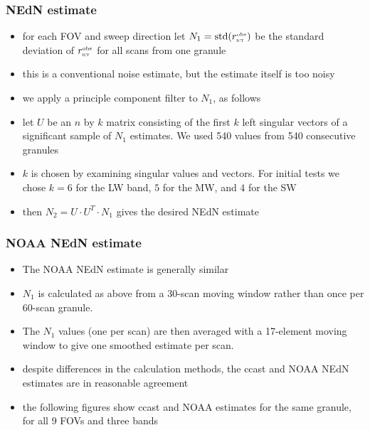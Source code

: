\documentclass[11pt]{beamer}
\begin{document}
\begin{frame}
\frametitle{NEdN estimate}

\begin{itemize}
  \item for each FOV and sweep direction let $N_1 = \mbox{std}(r_{\mbox{\tiny\textsc{ict}}}^{\mbox{\tiny obs}})$
    be the standard deviation of $r_{\mbox{\tiny\textsc{ict}}}^{\mbox{\tiny obs}}$ for all scans from one
    granule

  \item this is a conventional noise estimate, but the estimate
    itself is too noisy

  \item we apply a principle component filter to $N_1$, as follows

  \item let $U$ be an $n$ by $k$ matrix consisting of the first $k$
    left singular vectors of a significant sample of $N_1$
    estimates.  We used 540 values from 540 consecutive granules

  \item $k$ is chosen by examining singular values and vectors.  
    For initial tests we chose $k = 6$ for the LW band, $5$ for 
    the MW, and $4$ for the SW

  \item then $N_2 = U \cdot U^T \cdot N_1$ gives the desired NEdN
    estimate
\end{itemize}

\end{frame}
\begin{frame}
\frametitle{NOAA NEdN estimate}

\begin{itemize}
  \item The NOAA NEdN estimate is generally similar
  \item $N_1$ is calculated as above from a 30-scan moving window
    rather than once per 60-scan granule.  
  \item The $N_1$ values (one per scan) are then averaged with a
    17-element moving window to give one smoothed estimate per scan.
  \item despite differences in the calculation methods, the ccast
    and NOAA NEdN estimates are in reasonable agreement
  \item the following figures show ccast and NOAA estimates for the
    same granule, for all 9 FOVs and three bands

\end{itemize}

\end{frame}
\end{document}
